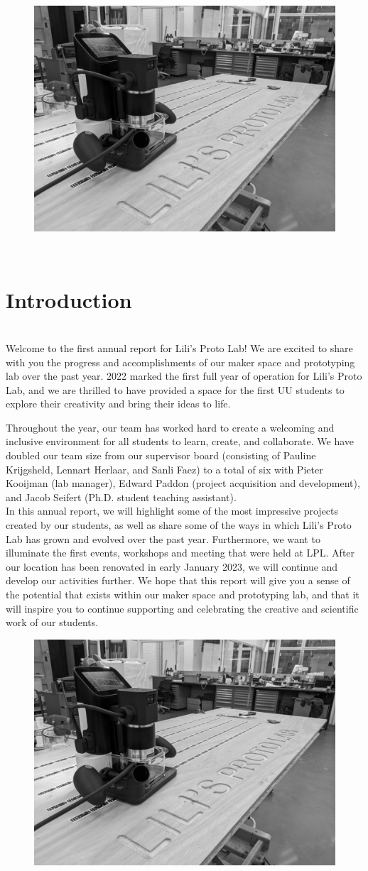\documentclass{report}
\newcommand\pagetitle{SectionTitle}
\newcommand{\LPLsection}[1]{%
\begin{figure}%
    \centering%
    \includegraphics[height=\textheight]{design_images/LPL_shaper.jpg}%
\end{figure}%
\clearpage%
\,\vspace{\textheight/3}%
\renewcommand\pagetitle{#1}%
\section*{\centering \pagetitle}%
\addcontentsline{toc}{section}{\protect\numberline{}\pagetitle}%
\clearpage%
}
\begin{document}
\LPLsection{Introduction}

 \\

Welcome to the first annual report for Lili's Proto Lab! We are excited to share with you the progress and accomplishments of our maker space and prototyping lab over the past year. 2022 marked the first full year of operation for Lili's Proto Lab, and we are thrilled to have provided a space for the first UU students to explore their creativity and bring their ideas to life.

Throughout the year, our team has worked hard to create a welcoming and inclusive environment for all students to learn, create, and collaborate. We have doubled our team size from our supervisor board (consisting of Pauline Krijgsheld, Lennart Herlaar, and Sanli Faez) to a total of six with Pieter Kooijman (lab manager), Edward Paddon (project acquisition and development), and Jacob Seifert (Ph.D. student teaching assistant). \\

In this annual report, we will highlight some of the most impressive projects created by our students, as well as share some of the ways in which Lili's Proto Lab has grown and evolved over the past year. Furthermore, we want to illuminate the first events, workshops and meeting that were held at LPL. After our location has been renovated in early January 2023, we will continue and develop our activities further. We hope that this report will give you a sense of the potential that exists within our maker space and prototyping lab, and that it will inspire you to continue supporting and celebrating the creative and scientific work of our students. 

\clearpage

\begin{figure}
    \centering
    \includegraphics[height=\textheight]{design_images/LPL_shaper.jpg}
\end{figure}
\clearpage
\,\vspace{\textheight/3}
\renewcommand\pagetitle{Overview}   %
\end{document}
